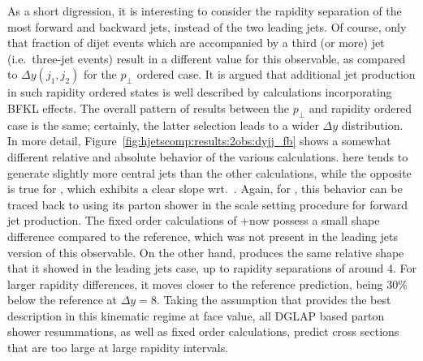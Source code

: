 As a short digression, it is interesting to consider the rapidity 
separation of the most forward and backward jets, instead of the two
leading jets. Of course, only that fraction of dijet events which are accompanied by 
a third (or more) jet (i.e.~three-jet events) result in 
a different value for this observable, as compared to $\Delta
y(j_1,j_2)$ for the $p_\perp$ ordered case. It is argued that
additional jet production in such rapidity ordered states is well
described by calculations incorporating BFKL effects.
The overall pattern of results between the $p_\perp$ and rapidity
ordered case is the same; certainly, the latter selection leads to a
wider $\Delta y$ distribution. In more detail,
Figure~\ref{fig:hjetscomp:results:2obs:dyjj_fb} shows a somewhat
different relative and absolute behavior of the various calculations.
\Powheg \NNLOPS here tends to generate slightly more 
central jets than the other calculations, while the opposite is true 
for \Sherpa \MEPSatNLO, which exhibits a clear slope wrt.~\Powheg. Again,
for \Sherpa \MEPSatNLO, this behavior can be traced back to \Sherpa \MEPSatNLO using its parton
shower in the scale setting procedure for forward jet production. 
The fixed order calculations of \GoSam{}+\Sherpa now possess a small
shape difference compared to the \Powheg reference, which was not
present in the leading jets version of this observable. On the
other hand, \Hej produces the same relative shape that it showed in the 
leading jets case, up to rapidity separations of around $4$. For
larger rapidity differences, it moves closer to
the reference prediction, being 30\% below the reference at
$\Delta y=8$. Taking the assumption that  \Hej provides the best description in
this kinematic regime  at face value, all DGLAP based parton shower 
resummations, as well as fixed order calculations, predict 
cross sections that are too large at large rapidity intervals.

